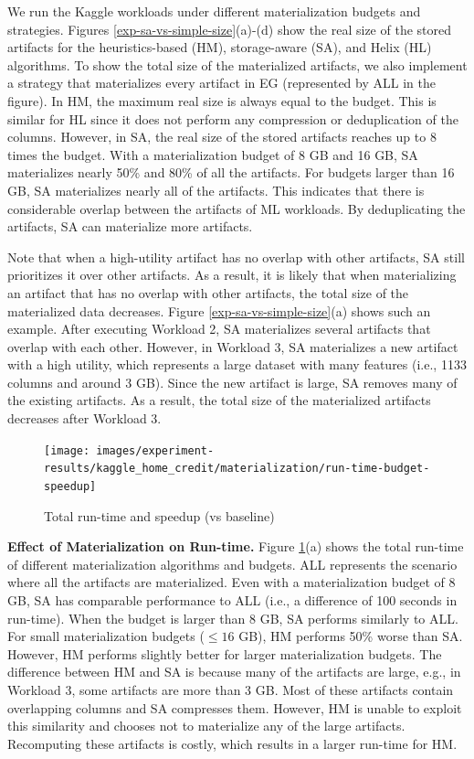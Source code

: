 We run the Kaggle workloads under different materialization budgets and strategies.
Figures \ref{exp-sa-vs-simple-size}(a)-(d) show the real size of the stored artifacts for the heuristics-based (HM), storage-aware (SA), and Helix (HL) algorithms.
To show the total size of the materialized artifacts, we also implement a strategy that materializes every artifact in EG (represented by ALL in the figure).
In HM, the maximum real size is always equal to the budget.
This is similar for HL since it does not perform any compression or deduplication of the columns.
However, in SA, the real size of the stored artifacts reaches up to 8 times the budget.
With a materialization budget of 8 GB and 16 GB, SA materializes nearly 50\% and 80\% of all the artifacts.
For budgets larger than 16 GB, SA materializes nearly all of the artifacts.
This indicates that there is considerable overlap between the artifacts of ML workloads.
By deduplicating the artifacts, SA can materialize more artifacts.

Note that when a high-utility artifact has no overlap with other artifacts, SA still prioritizes it over other artifacts.
As a result, it is likely that when materializing an artifact that has no overlap with other artifacts, the total size of the materialized data decreases.
Figure \ref{exp-sa-vs-simple-size}(a) shows such an example.
After executing Workload 2, SA materializes several artifacts that overlap with each other.
However, in Workload 3, SA materializes a new artifact with a high utility, which represents a large dataset with many features (i.e., 1133 columns and around 3 GB).
Since the new artifact is large, SA removes many of the existing artifacts.
As a result, the total size of the materialized artifacts decreases after Workload 3.

\begin{figure}[t]
\centering
\texttt{[image: images/experiment-results/kaggle\_home\_credit/materialization/run-time-budget-speedup]}
\caption{Total run-time and speedup (vs baseline)}
\label{run-time-vs-mat}
\vspace{-4mm}
\end{figure}
\textbf{Effect of Materialization on Run-time.}
Figure \ref{run-time-vs-mat}(a) shows the total run-time of different materialization algorithms and budgets.
ALL represents the scenario where all the artifacts are materialized.
Even with a materialization budget of 8 GB, SA has comparable performance to ALL (i.e., a difference of 100 seconds in run-time).
When the budget is larger than 8 GB, SA performs similarly to ALL.
For small materialization budgets ($\leq 16$ GB), HM performs 50\% worse than SA.
However, HM performs slightly better for larger materialization budgets.
The difference between HM and SA is because many of the artifacts are large, e.g., in Workload 3, some artifacts are more than 3 GB.
Most of these artifacts contain overlapping columns and SA compresses them.
However, HM is unable to exploit this similarity and chooses not to materialize any of the large artifacts.
Recomputing these artifacts is costly, which results in a larger run-time for HM.

